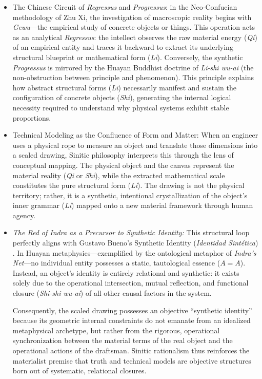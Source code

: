 \documentclass[11pt, a4paper]{article}
\begin{document}
\begin{itemize}
	\item \textrm{The Chinese Circuit of \textit{Regressus} and \textit{Progressus}:} in the Neo-Confucian methodology of Zhu Xi, the investigation of macroscopic reality begins with \textit{Gewu}---the empirical study of concrete objects or things. This operation acts as an analytical \textit{Regressus}: the intellect observes the raw material energy (\textit{Qi}) of an empirical entity and traces it backward to extract its underlying structural blueprint or mathematical form (\textit{Li}). Conversely, the synthetic \textit{Progressus} is mirrored by the Huayan Buddhist doctrine of \textit{Li-shi wu-ai} (the non-obstruction between principle and phenomenon). This principle explains how abstract structural forms (\textit{Li}) necessarily manifest and sustain the configuration of concrete objects (\textit{Shi}), generating the internal logical necessity required to understand why physical systems exhibit stable proportions.

	\item \textrm{Technical Modeling as the Confluence of Form and Matter:} When an engineer uses a physical rope to measure an object and translate those dimensions into a scaled drawing, Sinitic philosophy interprets this through the lens of conceptual mapping. The physical object and the canvas represent the material reality (\textit{Qi} or \textit{Shi}), while the extracted mathematical scale constitutes the pure structural form (\textit{Li}). The drawing is not the physical territory; rather, it is a synthetic, intentional crystallization of the object's inner grammar (\textit{Li}) mapped onto a new material framework through human agency.

	\item \textit{The Red of Indra as a Precursor to Synthetic Identity:} This structural loop perfectly aligns with Gustavo Bueno's \textrm{Synthetic Identity} (\textit{Identidad Sintética}) \cite{Bueno1992cierre}. In Huayan metaphysics---exemplified by the ontological metaphor of \textit{Indra's Net}---no individual entity possesses a static, tautological essence ($A=A$). Instead, an object's identity is entirely relational and synthetic: it exists solely due to the operational intersection, mutual reflection, and functional closure (\textit{Shi-shi wu-ai}) of all other causal factors in the system.

	Consequently, the scaled drawing possesses an objective ``synthetic identity'' because its geometric internal constraints do not emanate from an idealized metaphysical archetype, but rather from the rigorous, operational synchronization between the material terms of the real object and the operational actions of the draftsman. Sinitic rationalism thus reinforces the materialist premise that truth and technical models are objective structures born out of systematic, relational closures.
\end{itemize}
\end{document}
